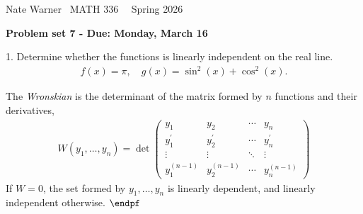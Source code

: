 \documentclass{report}
\title{\Huge{}}
\author{\huge{Nathan Warner}}
\date{\huge{}}
\begin{document}
    \pagebreak \bigbreak \noindent
    Nate Warner \ \quad \quad \quad \quad \quad \quad \quad \quad \quad \quad \quad \quad  MATH 336 \quad  \quad \quad \quad \quad \quad \quad \quad \quad \ \ \quad \quad Spring 2026
    \begin{center}
        \textbf{Problem set 7 - Due: Monday, March 16}
    \end{center}
    \bigbreak \noindent 
    \begin{mdframed}
        1. Determine whether the functions is linearly independent on the real line.
        \begin{align*}
            f(x) = \pi, \quad g(x) = \sin^{2}{\left(x\right)} + \cos^{2}{\left(x\right)}
        .\end{align*}
    \end{mdframed}
    \bigbreak \noindent 
    \begin{remark}
       The \textit{Wronskian} is the determinant of the matrix formed by $n$ functions and their derivatives,
       \begin{align*}
           W(y_{1}, \dots, y_{n}) = \det\begin{pmatrix} 
               y_{1} & y_{2} & \cdots & y_{n} \\
               y^{\prime}_{1} & y^{\prime}_{2} & \cdots & y^{\prime}_{n} \\
               \vdots & \vdots & \ddots &  \vdots \\
               y^{(n-1)}_{1} & y^{(n-1)}_{2} & \cdots & y^{(n-1)}_{n} 
           \end{pmatrix}
       \end{align*}
       If $W = 0$, the set formed by $y_{1}, \dots, y_{n}$ is linearly dependent, and linearly independent otherwise. $\endpf$
    \end{remark}
\end{document}
